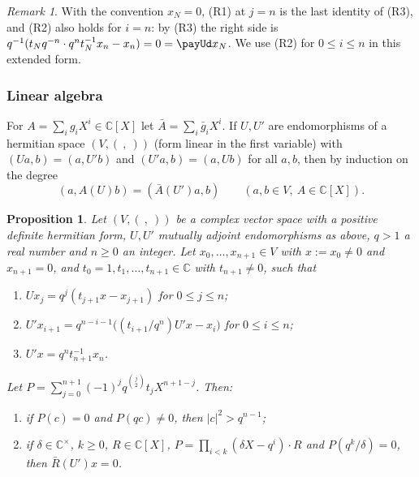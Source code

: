 \documentclass[10pt]{amsart}
\newtheorem{proposition}[theorem]{Proposition}
\theoremstyle{definition}
\theoremstyle{remark}
\newtheorem{remark}[theorem]{Remark}
\newcommand{\C}{\mathbb C}
\begin{document}
\begin{remark}\label{pay:rem-rec}
With the convention $x_N=0$, (R1) at $j=n$ is the last identity of (R3), and (R2) also holds for
$i=n$: by (R3) the right side is $q^{-1}(t_Nq^{-n}\cdot q^nt_N^{-1}x_n-x_n)=0=\payUd x_N$. We use (R2)
for $0\le i\le n$ in this extended form.
\end{remark}

\subsubsection{Linear algebra}\label{pay:ss-lin}

For $A=\sum_ig_iX^i\in\C[X]$ let $\bar A=\sum_i\bar g_iX^i$. If $U,U'$ are endomorphisms of a
hermitian space $(V,(\ ,\ ))$ (form linear in the first variable) with $(Ua,b)=(a,U'b)$ and $(U'a,b)=
(a,Ub)$ for all $a,b$, then by induction on the degree
\begin{equation}\label{pay:eq-adj}
(a,A(U)b)=(\bar A(U')a,b)\qquad(a,b\in V,\ A\in\C[X]).
\end{equation}

\begin{proposition}\label{pay:lin}
Let $(V,(\ ,\ ))$ be a complex vector space with a positive definite hermitian form, $U,U'$ mutually
adjoint endomorphisms as above, $q>1$ a real number and $n\ge0$ an integer. Let $x_0,\dots,x_{n+1}\in
V$ with $x:=x_0\ne0$ and $x_{n+1}=0$, and $t_0=1,t_1,\dots,t_{n+1}\in\C$ with $t_{n+1}\ne0$, such that
\begin{enumerate}
\item[(R1)] $Ux_j=q^j(t_{j+1}x-x_{j+1})$ for $0\le j\le n$;
\item[(R2)] $U'x_{i+1}=q^{n-i-1}\bigl((t_{i+1}/q^n)U'x-x_i\bigr)$ for $0\le i\le n$;
\item[(R3)] $U'x=q^nt_{n+1}^{-1}x_n$.
\end{enumerate}
Let $P=\sum_{j=0}^{n+1}(-1)^jq^{\binom j2}t_jX^{n+1-j}$. Then:
\begin{enumerate}
\item[(a)] if $P(c)=0$ and $P(qc)\ne0$, then $|c|^2>q^{n-1}$;
\item[(b)] if $\delta\in\C^\times$, $k\ge0$, $R\in\C[X]$, $P=\prod_{i<k}(\delta X-q^i)\cdot R$ and $P(q^k/\delta)=0$,
then $\bar R(U')x=0$.
\end{enumerate}
\end{proposition}
\end{document}
